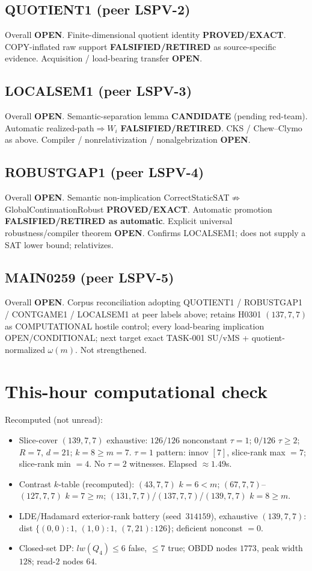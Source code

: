 \documentclass[11pt]{article}
\begin{document}
\subsection*{QUOTIENT1 (peer LSPV-2)}
Overall \textbf{OPEN}. Finite-dimensional quotient identity \textbf{PROVED/EXACT}.
COPY-inflated raw support \textbf{FALSIFIED/RETIRED} as source-specific evidence.
Acquisition / load-bearing transfer \textbf{OPEN}.

\subsection*{LOCALSEM1 (peer LSPV-3)}
Overall \textbf{OPEN}. Semantic-separation lemma \textbf{CANDIDATE} (pending red-team).
Automatic realized-path$\Rightarrow W_i$ \textbf{FALSIFIED/RETIRED}.
CKS / Chew--Clymo as above. Compiler / nonrelativization / nonalgebrization \textbf{OPEN}.

\subsection*{ROBUSTGAP1 (peer LSPV-4)}
Overall \textbf{OPEN}. Semantic non-implication CorrectStaticSAT$\not\Rightarrow$GlobalContinuationRobust
\textbf{PROVED/EXACT}. Automatic promotion \textbf{FALSIFIED/RETIRED as automatic}.
Explicit universal robustness/compiler theorem \textbf{OPEN}. Confirms LOCALSEM1;
does not supply a SAT lower bound; relativizes.

\subsection*{MAIN0259 (peer LSPV-5)}
Overall \textbf{OPEN}. Corpus reconciliation adopting QUOTIENT1 / ROBUSTGAP1 / CONTGAME1 /
LOCALSEM1 at peer labels above; retains H0301 $(137,7,7)$ as COMPUTATIONAL hostile control;
every load-bearing implication OPEN/CONDITIONAL; next target exact TASK-001 SU/vMS +
quotient-normalized $\omega(m)$. Not strengthened.

\section*{This-hour computational check}
Recomputed (not unread):
\begin{itemize}
\item Slice-cover $(139,7,7)$ exhaustive: $126/126$ nonconstant $\tau{=}1$;
  $0/126$ $\tau{\ge}2$; $R{=}7$, $d{=}21$; $k{=}8{\ge}m{=}7$.
  $\tau{=}1$ pattern: innov $[7]$, slice-rank max $=7$; slice-rank min $=4$.
  No $\tau{=}2$ witnesses. Elapsed $\approx1.49$s.
\item Contrast $k$-table (recomputed): $(43,7,7)$ $k{=}6{<}m$;
  $(67,7,7)$--$(127,7,7)$ $k{=}7{\ge}m$; $(131,7,7)$/$(137,7,7)$/$(139,7,7)$ $k{=}8{\ge}m$.
\item LDE/Hadamard exterior-rank battery (seed~$314159$), exhaustive $(139,7,7)$:
  dist $\{(0,0){:}1,\,(1,0){:}1,\,(7,21){:}126\}$; deficient nonconst $=0$.
\item Closed-set DP: $lw(Q_4)\le6$ false, $\le7$ true; OBDD nodes $1773$, peak width $128$;
  read-$2$ nodes $64$.
\end{itemize}
\end{document}
